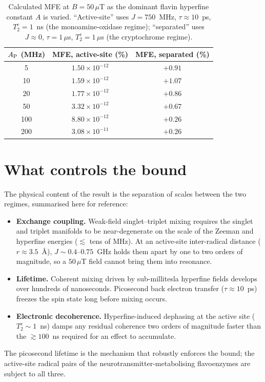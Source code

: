 \documentclass[11pt]{article}
\begin{document}
\begin{table}[h]
\centering
\caption{Calculated MFE at $B = 50\,\mu$T as the dominant flavin hyperfine
constant $A$ is varied. ``Active-site'' uses $J = 750$~MHz, $\tau \approx 10$~ps,
$T_2^e = 1$~ns (the monoamine-oxidase regime); ``separated'' uses
$J \approx 0$, $\tau = 1\,\mu$s, $T_2^e = 1\,\mu$s (the cryptochrome regime).}
\label{tab:hf}
\begin{tabular}{c c c}
\toprule
$A_{\rm P}$ (MHz) & MFE, active-site (\%) & MFE, separated (\%) \\
\midrule
5   & $1.50\times10^{-12}$ & $+0.91$ \\
10  & $1.59\times10^{-12}$ & $+1.07$ \\
20  & $1.77\times10^{-12}$ & $+0.86$ \\
50  & $3.32\times10^{-12}$ & $+0.67$ \\
100 & $8.80\times10^{-12}$ & $+0.26$ \\
200 & $3.08\times10^{-11}$ & $+0.26$ \\
\bottomrule
\end{tabular}
\end{table}

\section{What controls the bound}

The physical content of the result is the separation of scales between the two
regimes, summarised here for reference:
\begin{itemize}
\item \textbf{Exchange coupling.} Weak-field singlet--triplet mixing requires the
singlet and triplet manifolds to be near-degenerate on the scale of the Zeeman
and hyperfine energies ($\lesssim$ tens of MHz). At an active-site inter-radical
distance ($r \approx 3.5$~\AA), $J \sim 0.4$--$0.75$~GHz holds them apart by one to two
orders of magnitude, so a $50\,\mu$T field cannot bring them into resonance.
\item \textbf{Lifetime.} Coherent mixing driven by sub-millitesla hyperfine
fields develops over hundreds of nanoseconds. Picosecond back electron transfer
($\tau \approx 10$~ps) freezes the spin state long before mixing occurs.
\item \textbf{Electronic decoherence.} Hyperfine-induced dephasing at the active
site ($T_2^e \sim 1$~ns) damps any residual coherence two orders of magnitude
faster than the $\gtrsim 100$~ns required for an effect to accumulate.
\end{itemize}
The picosecond lifetime is the mechanism that robustly enforces the bound; the active-site
radical pairs of the neurotransmitter-metabolising flavoenzymes are subject to
all three.
\end{document}
